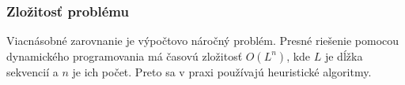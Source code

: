 \subsubsection{Zložitosť problému}
Viacnásobné zarovnanie je výpočtovo náročný problém. Presné riešenie pomocou dynamického programovania má časovú zložitosť $O(L^n)$, kde $L$ je dĺžka sekvencií a $n$ je ich počet. Preto sa v praxi používajú heuristické algoritmy.
